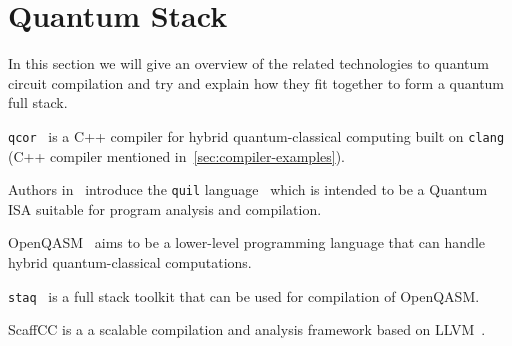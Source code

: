\section{Quantum Stack}

In this section we will give an overview of the related technologies to quantum circuit compilation and try and explain how they fit together to form a quantum full stack.

\texttt{qcor}~\cite{qcor} is a C++ compiler for hybrid quantum-classical computing built on \texttt{clang} (C++ compiler mentioned in~\cref{sec:compiler-examples}).

Authors in~\cite{qisa} introduce the \texttt{quil} language~\cite{quil} which is intended to be a Quantum \ac{ISA} suitable for program analysis and compilation.

OpenQASM~\cite{openqasm2,openqasm3} aims to be a lower-level programming language that can handle hybrid quantum-classical computations.

\texttt{staq}~\cite{staq} is a full stack toolkit that can be used for compilation of OpenQASM.

ScaffCC is a a scalable compilation and analysis framework based on LLVM~\cite{scaffcc}.
